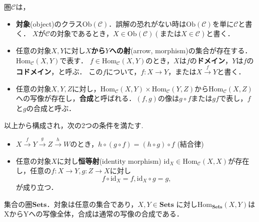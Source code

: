 
\begin{defi}
圏$\mathcal{C}$は，
\begin{itemize}

\item 
{\bf 対象}(object)のクラス$\mathrm{Ob}(\mathcal{C})$．誤解の恐れがない時は$\mathrm{Ob}(\mathcal{C})$を単に$\mathcal{C}$と書く．
$X$が$\mathcal{C}$の対象であるとき，$X \in \mathrm{Ob}(\mathcal{C}) (または X \in \mathcal{C})$と書く．

\item 
任意の対象$X,Y$に対し{\bf $X$から$Y$への射}(arrow, morphism)の集合が存在する．
$\mathrm{Hom}_\mathcal{C}(X,Y)$で表す．
$f \in \mathrm{Hom}_\mathcal{C}(X,Y)$のとき，$X$は$f$の{\bf ドメイン}，$Y$は$f$の{\bf コドメイン}，と呼ぶ．
この$f$について，$f:X \to Y$，または$X \xrightarrow{f} Y$と書く．

\item 
任意の対象$X,Y,Z$に対し，$\mathrm{Hom}_\mathcal{C}(X,Y) \times \mathrm{Hom}_\mathcal{C}(Y,Z)$から$\mathrm{Hom}_\mathcal{C}(X,Z)$への写像が存在し，{\bf 合成}と呼ばれる．$(f,g)$の像は$g \circ f$または$gf$で表し，$f$と$g$の合成と呼ぶ．

\end{itemize}
以上から構成され，次の2つの条件を満たす.
\begin{itemize}
\item
$X \xrightarrow{f} Y \xrightarrow{g} Z \xrightarrow{h} W$のとき，$h \circ (g \circ f) = (h \circ g) \circ f$ (結合律)
\item
任意の対象$X$に対し{\bf 恒等射}(identity morphism) $\mathrm{id}_X \in \mathrm{Hom}_\mathcal{C}(X,X)$が存在し，任意の$f:X \to Y , g:Z \to X$に対し
\[
	f \circ \mathrm{id}_X = f, 	\mathrm{id}_X \circ g = g,
\]
が成り立つ．
\end{itemize}
\end{defi} \proofend


\begin{ex}
集合の圏$\mathbf{Sets}$．対象は任意の集合であり，$X,Y \in \mathbf{Sets}$ に対し$\mathrm{Hom}_\mathbf{Sets}(X,Y)$はXからYへの写像全体，合成は通常の写像の合成である．
\end{ex} \proofend

